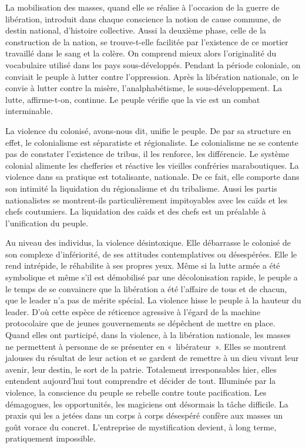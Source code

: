 \documentclass[french,twoside]{book} %
\begin{document}
La mobilisation des masses, quand elle se réalise à l’occasion de la guerre de libération, introduit dans chaque conscience la notion de cause commune, de destin national, d’histoire collective. Aussi la deuxième phase, celle de la construction de la nation, se trouve-t-elle facilitée par l’existence de ce mortier travaillé dans le sang et la colère. On comprend mieux alors l’originalité du vocabulaire utilisé dans les pays sous-développés. Pendant la période coloniale, on conviait le peuple à lutter contre l’oppression. Après la libération nationale, on le convie à lutter contre la misère, l’analphabétisme, le sous-développement. La lutte, affirme-t-on, continue. Le peuple vérifie que la vie est un combat interminable.\par
La violence du colonisé, avons-nous dit, unifie le peuple. De par sa structure en effet, le colonialisme est séparatiste et régionaliste. Le colonialisme ne se contente pas de constater l’existence de tribus, il les renforce, les différencie. Le système colonial alimente les chefferies et réactive les vieilles confréries maraboutiques. La violence dans sa pratique est totalisante, nationale. De ce fait, elle comporte dans son intimité la liquidation du régionalisme et du tribalisme. Aussi les partis nationalistes se montrent-ils particulièrement impitoyables avec les caïds et les chefs coutumiers. La liquidation des caïds et des chefs est un préalable à l’unification du peuple.\par
Au niveau des individus, la violence désintoxique. Elle débarrasse le colonisé de son complexe d’infériorité, de ses attitudes contemplatives ou désespérées. Elle le rend intrépide, le réhabilite à ses propres yeux. Même si la lutte armée a été symbolique et même s’il est démobilisé par une décolonisation rapide, le peuple a le temps de se convaincre que la libération a été l’affaire de tous et de chacun, que le leader n’a pas de mérite   spécial. La violence hisse le peuple à la hauteur du leader. D’où cette espèce de réticence agressive à l’égard de la machine protocolaire que de jeunes gouvernements se dépêchent de mettre en place. Quand elles ont participé, dans la violence, à la libération nationale, les masses ne permettent à personne de se présenter en « libérateur ». Elles se montrent jalouses du résultat de leur action et se gardent de remettre à un dieu vivant leur avenir, leur destin, le sort de la patrie. Totalement irresponsables hier, elles entendent aujourd’hui tout comprendre et décider de tout. Illuminée par la violence, la conscience du peuple se rebelle contre toute pacification. Les démagogues, les opportunités, les magiciens ont désormais la tâche difficile. La praxis qui les a jetées dans un corps à corps désespéré confère aux masses un goût vorace du concret. L’entreprise de mystification devient, à long terme, pratiquement impossible.\par
\end{document}
